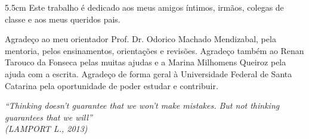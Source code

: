 \begin{dedicatoria}
\vspace*{\fill}
\noindent
\begin{adjustwidth*}{}{5.5cm} 
\raggedleft       
Este trabalho é dedicado aos meus amigos íntimos, irmãos, colegas de classe e aos meus queridos pais.
\end{adjustwidth*}
\end{dedicatoria}

\begin{agradecimentos}
Agradeço ao meu orientador Prof. Dr. Odorico Machado Mendizabal, pela mentoria, pelos ensinamentos, orientações e revisões. Agradeço também ao Renan Tarouco da Fonseca pelas muitas ajudas e a Marina Milhomens Queiroz pela ajuda com a escrita. Agradeço de forma geral à Universidade Federal de Santa Catarina pela oportunidade de poder estudar e contribuir.
\end{agradecimentos}

\begin{epigrafe}
\vspace*{\fill}
\begin{flushright}
\textit{``Thinking doesn't guarantee that we won't make mistakes. But not thinking guarantees that we will''\\
(LAMPORT L., 2013)}
\end{flushright}
\end{epigrafe}




